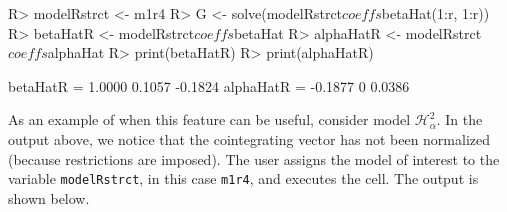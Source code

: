 \documentclass[article]{jss}
\begin{document}
\begin{CodeChunk} 
\begin{CodeInput}
R> modelRstrct <- m1r4
R> G <- solve(modelRstrct$coeffs$betaHat(1:r, 1:r))
R> betaHatR <- modelRstrct$coeffs$betaHat %
R> alphaHatR <- modelRstrct$coeffs$alphaHat %
R> print(betaHatR)
R> print(alphaHatR)
\end{CodeInput}
\begin{CodeOutput}
betaHatR =
    1.0000
    0.1057
   -0.1824
alphaHatR =
   -0.1877
         0
    0.0386
\end{CodeOutput}
\end{CodeChunk}  

As an example of when this feature can be useful, consider model $\mathscr{H}_{\alpha}^2$. In the output above, we notice that the cointegrating vector has not been normalized (because restrictions are imposed). The user assigns the model of interest to the variable \verb|modelRstrct|, in this case \verb|m1r4|, and executes the cell. The output is shown below.



\end{document}
